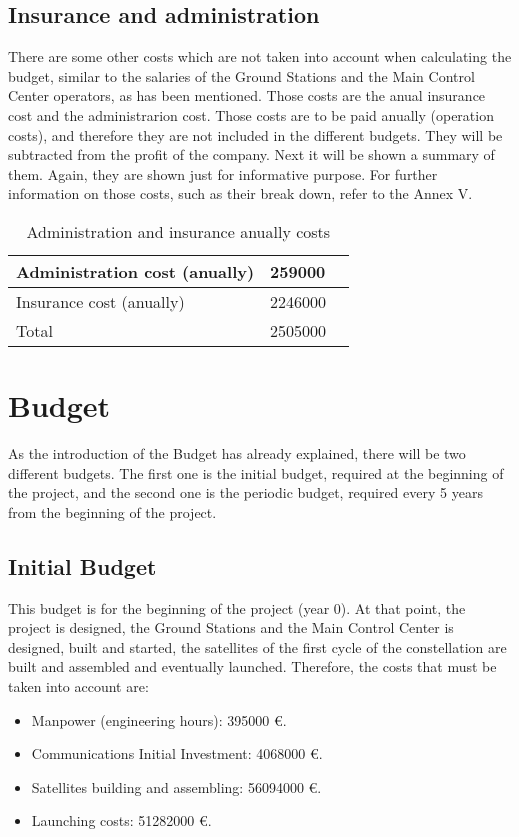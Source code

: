 \newpage
\section{Insurance and administration}
There are some other costs which are not taken into account when calculating the budget, similar to the salaries of the Ground Stations and the Main Control Center operators, as has been mentioned. Those costs are the anual insurance cost and the administrarion cost. Those costs are to be paid anually (operation costs), and therefore they are not included in the different budgets. They will be subtracted from the profit of the company. Next it will be shown a summary of them. Again, they are shown just for informative purpose. For further information on those costs, such as their break down, refer to the Annex V. 

\begin{table}[h]
\begin{center}
\begin{tabular}{ | l | l | }
\toprule
\hline
	Administration cost (anually) & 259000  \ \\ \hline
	Insurance cost (anually) & 2246000 \\ \hline
	\rowcolor[gray]{0.65}
	Total & 2505000 \ \\ \hline
	\bottomrule
\end{tabular}
\caption{Administration and insurance anually costs}
\end{center}
\end{table}

\chapter{Budget}
As the introduction of the Budget has already explained, there will be two different budgets. The first one is the initial budget, required at the beginning of the project, and the second one is the periodic budget, required every 5 years from the beginning of the project.

\section{Initial Budget}
This budget is for the beginning of the project (year 0). At that point, the project is designed, the Ground Stations and the Main Control Center is designed, built and started, the satellites of the first cycle of the constellation are built and assembled and eventually launched. Therefore, the costs that must be taken into account are:
\begin{itemize}
\item Manpower (engineering hours): 395000 \euro .
\item Communications Initial Investment: 4068000 \euro .
\item Satellites building and assembling: 56094000 \euro .
\item Launching costs: 51282000 \euro .
\end{itemize}

